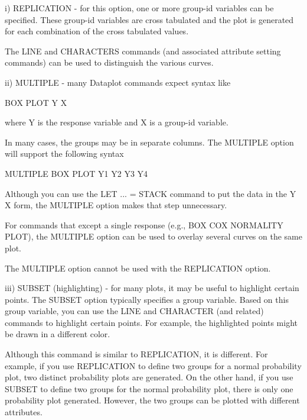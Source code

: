 {          i) REPLICATION - for this option, one or more group-id
             variables can be specified.  These group-id variables
             are cross tabulated and the plot is generated for
             each combination of the cross tabulated values.

             The LINE and CHARACTERS commands (and associated attribute
             setting commands) can be used to distinguish the
             various curves.

         ii) MULTIPLE - many Dataplot commands expect syntax like

                 BOX PLOT Y X

             where Y is the response variable and X is a group-id
             variable.

             In many cases, the groups may be in separate
             columns.  The MULTIPLE option will support the
             following syntax

                 MULTIPLE BOX PLOT Y1 Y2 Y3 Y4

             Although you can use the LET ... = STACK command to
             put the data in the Y X form, the MULTIPLE option
             makes that step unnecessary.

             For commands that except a single response (e.g.,
             BOX COX NORMALITY PLOT), the MULTIPLE option can be
             used to overlay several curves on the same plot.

             The MULTIPLE option cannot be used with the
             REPLICATION option.

        iii) SUBSET (highlighting) - for many plots, it may be
             useful to highlight certain points.  The SUBSET option
             typically specifies a group variable.  Based on this
             group variable, you can use the LINE and CHARACTER
             (and related) commands to highlight certain points.
             For example, the highlighted points might be drawn
             in a different color.

             Although this command is similar to REPLICATION, it
             is different.  For example, if you use REPLICATION to
             define two groups for a normal probability plot,
             two distinct probability plots are generated.  On the
             other hand, if you use SUBSET to define two groups for
             the normal probability plot, there is only one probability
             plot generated.  However, the two groups can be plotted
             with different attributes.

}

